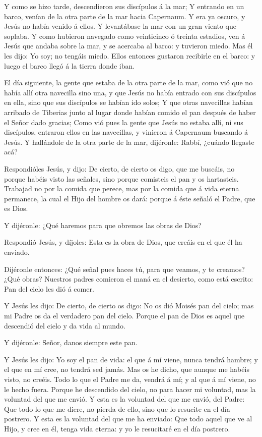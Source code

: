 Y como se hizo tarde, descendieron sus discípulos á la
mar;  Y entrando en un barco, venían de la otra parte de la
mar hacia Capernaum. Y era ya oscuro, y Jesús no había venido á ellos.
 Y levantábase la mar con un gran viento que soplaba.
 Y como hubieron navegado como veinticinco ó treinta
estadios, ven á Jesús que andaba sobre la mar, y se acercaba al barco: y
tuvieron miedo.  Mas él les dijo: Yo soy; no tengáis miedo.
 Ellos entonces gustaron recibirle en el barco: y luego el
barco llegó á la tierra donde iban.

 El día siguiente, la gente que estaba de la otra parte de
la mar, como vió que no había allí otra navecilla sino una, y que Jesús
no había entrado con sus discípulos en ella, sino que sus discípulos se
habían ido solos;  Y que otras navecillas habían arribado
de Tiberias junto al lugar donde habían comido el pan después de haber
el Señor dado gracias;  Como vió pues la gente que Jesús no
estaba allí, ni sus discípulos, entraron ellos en las navecillas, y
vinieron á Capernaum buscando á Jesús.  Y hallándole de la
otra parte de la mar, dijéronle: Rabbí, ¿cuándo llegaste acá?

 Respondióles Jesús, y dijo: De cierto, de cierto os digo,
que me buscáis, no porque habéis visto las señales, sino porque
comisteis el pan y os hartasteis.  Trabajad no por la
comida que perece, mas por la comida que á vida eterna permanece, la
cual el Hijo del hombre os dará: porque á éste señaló el Padre, que es
Dios.

 Y dijéronle: ¿Qué haremos para que obremos las obras de
Dios?

 Respondió Jesús, y díjoles: Esta es la obra de Dios, que
creáis en el que él ha enviado.

 Dijéronle entonces: ¿Qué señal pues haces tú, para que
veamos, y te creamos? ¿Qué obras?  Nuestros padres comieron
el maná en el desierto, como está escrito: Pan del cielo les dió á
comer.

 Y Jesús les dijo: De cierto, de cierto os digo: No os dió
Moisés pan del cielo; mas mi Padre os da el verdadero pan del cielo.
 Porque el pan de Dios es aquel que descendió del cielo y
da vida al mundo.

 Y dijéronle: Señor, danos siempre este pan.

 Y Jesús les dijo: Yo soy el pan de vida: el que á mí
viene, nunca tendrá hambre; y el que en mí cree, no tendrá sed jamás.
 Mas os he dicho, que aunque me habéis visto, no creéis.
 Todo lo que el Padre me da, vendrá á mí; y al que á mí
viene, no le hecho fuera.  Porque he descendido del cielo,
no para hacer mi voluntad, mas la voluntad del que me envió.
 Y esta es la voluntad del que me envió, del Padre: Que
todo lo que me diere, no pierda de ello, sino que lo resucite en el día
postrero.  Y esta es la voluntad del que me ha enviado: Que
todo aquel que ve al Hijo, y cree en él, tenga vida eterna: y yo le
resucitaré en el día postrero.

